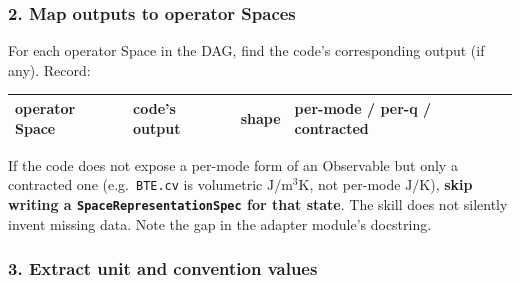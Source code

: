 \documentclass[11pt,a4paper]{article}
\begin{document}
\subsubsection*{2. Map outputs to operator Spaces}

For each operator Space in the DAG, find the code's corresponding output (if
any). Record:
\begin{center}
\begin{tabular}{llll}
\toprule
operator Space & code's output & shape & per-mode / per-q / contracted \\
\bottomrule
\end{tabular}
\end{center}
If the code does not expose a per-mode form of an Observable but only a contracted
one (e.g.\ \texttt{BTE.cv} is volumetric $\mathrm{J/m^3K}$, not per-mode
$\mathrm{J/K}$), \textbf{skip writing a \texttt{SpaceRepresentationSpec} for that
state}. The skill does not silently invent missing data. Note the gap in the
adapter module's docstring.

\subsubsection*{3. Extract unit and convention values}
\end{document}

